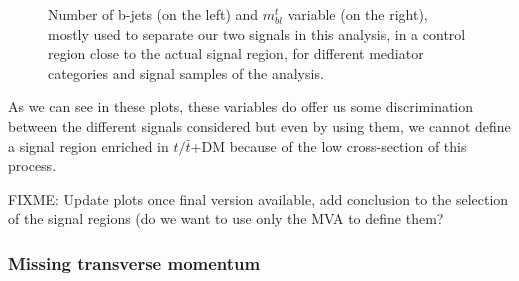 \documentclass[a4paper, 10pt, openright]{report}
\begin{document}
\begin{figure}[htbp]
\caption{Number of b-jets (on the left) and $m_{bl}^t$ variable (on the right), mostly used to separate our two signals in this analysis, in a control region close to the actual signal region, for different mediator categories and signal samples of the analysis.}
\label{fig:signalsDiscrimination}
\end{figure}

As we can see in these plots, these variables do offer us some discrimination between the different signals considered but even by using them, we cannot define a signal region enriched in $t/ \bar t$+DM because of the low cross-section of this process.

\color{red} FIXME: Update plots once final version available, add conclusion to the selection of the signal regions (do we want to use only the MVA to define them? \color{black}

\subsubsection*{Missing transverse momentum}
\end{document}
